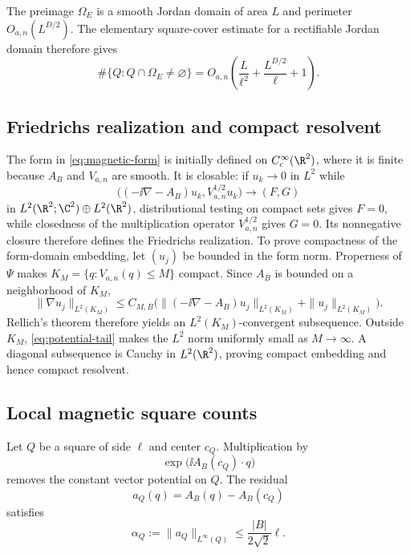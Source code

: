 The preimage \(\Omega_E\) is a smooth Jordan domain of area \(L\) and
perimeter \(O_{a,n}(L^{D/2})\).  The elementary square-cover estimate for a
rectifiable Jordan domain therefore gives
\begin{equation}
 \#\{Q:Q\cap\Omega_E\neq\varnothing\}
 =O_{a,n}\!\left(
 \frac{L}{\ell^2}+\frac{L^{D/2}}{\ell}+1\right).
 \label{eq:app-square-cover}
\end{equation}

\subsection{Friedrichs realization and compact resolvent}
\label{app:compactness}

The form in \cref{eq:magnetic-form} is initially defined on
\(C_c^\infty(\R^2)\), where it is finite because \(A_B\) and \(V_{a,n}\)
are smooth.  It is closable: if \(u_k\to0\) in \(L^2\) while
\[
 \bigl((-\ii\nabla-A_B)u_k,V_{a,n}^{1/2}u_k\bigr)\to(F,G)
\]
in \(L^2(\R^2;\C^2)\oplus L^2(\R^2)\), distributional testing on compact
sets gives \(F=0\), while closedness of the multiplication operator
\(V_{a,n}^{1/2}\) gives \(G=0\).  Its nonnegative closure therefore defines
the Friedrichs realization.
To prove compactness of the form-domain embedding, let \((u_j)\) be bounded
in the form norm.  Properness of \(\Psi\) makes
\(K_M=\{q:V_{a,n}(q)\leq M\}\) compact.  Since \(A_B\) is bounded on a
neighborhood of \(K_M\),
\begin{equation}
 \|\nabla u_j\|_{L^2(K_M)}
 \leq C_{M,B}\bigl(
 \|(-\ii\nabla-A_B)u_j\|_{L^2(K_M)}+
 \|u_j\|_{L^2(K_M)}\bigr).
\end{equation}
Rellich's theorem therefore yields an \(L^2(K_M)\)-convergent subsequence.
Outside \(K_M\), \cref{eq:potential-tail} makes the \(L^2\) norm uniformly
small as \(M\to\infty\).  A diagonal subsequence is Cauchy in
\(L^2(\R^2)\), proving compact embedding and hence compact resolvent.

\subsection{Local magnetic square counts}
\label{app:magnetic-count}

Let \(Q\) be a square of side \(\ell\) and center \(c_Q\).  Multiplication
by
\begin{equation}
 \exp\!\bigl(\ii A_B(c_Q)\cdot q\bigr)
\end{equation}
removes the constant vector potential on \(Q\).  The residual
\begin{equation}
 a_Q(q)=A_B(q)-A_B(c_Q)
\end{equation}
satisfies
\begin{equation}
 \alpha_Q:=\|a_Q\|_{L^\infty(Q)}
 \leq \frac{|B|}{2\sqrt2}\ell.
 \label{eq:app-residual-gauge}
\end{equation}


